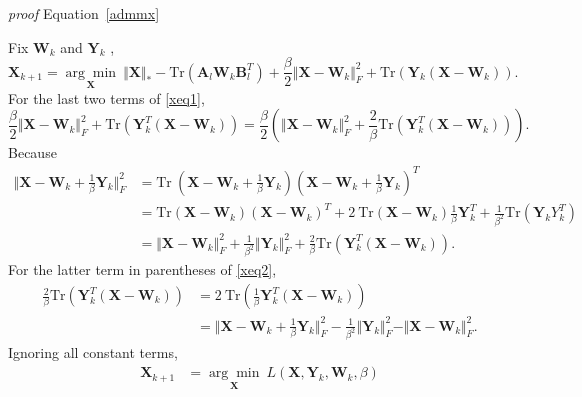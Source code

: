 \documentclass{article}
\begin{document}
{\textit{proof} Equation~\ref{admmx}

Fix $\mathbf W_k$ and $\mathbf Y_k$ ,
\begin{equation}
    \mathbf X_{k+1} =  \underset{\mathbf X}{\arg\min} \ \Vert\mathbf X \Vert_* - \text{Tr}(\mathbf A_l \mathbf W_k\mathbf B_l^T)    + \frac{\beta}{2}\Vert\mathbf X-\mathbf W_k \Vert_F^2 + \text{Tr}(\mathbf Y_k(\mathbf X-\mathbf W_k)).
    \label{xeq1}
\end{equation}
For the last two terms of \eqref{xeq1},
\begin{equation}
\frac{\beta}{2}\Vert\mathbf X-\mathbf W_k \Vert_F^2 + \text{Tr}(\mathbf Y_k^T(\mathbf X-\mathbf W_k))=  \frac{\beta}{2}\left( \Vert\mathbf X-\mathbf W_k \Vert_F^2 + \frac{2}{\beta} \text{Tr}(\mathbf Y_k^T(\mathbf X-\mathbf W_k)) \right).
\label{xeq2}
\end{equation}
Because
\begin{equation*}
    \begin{aligned}
        \Vert\mathbf X-\mathbf W_k+\frac{1}{\beta}\mathbf Y_k \Vert_F^2 & = \text{Tr} \ (\mathbf X-\mathbf W_k+\frac{1}{\beta}\mathbf Y_k)(\mathbf X-\mathbf W_k+\frac{1}{\beta}\mathbf Y_k)^T \\
        & = \text{Tr}(\mathbf X-\mathbf W_k)(\mathbf X-\mathbf W_k)^T + 2\ \text{Tr}(\mathbf X-\mathbf W_k)\frac{1}{\beta}\mathbf Y_k^T + \frac{1}{\beta^2}\text{Tr} (\mathbf Y_k Y_k^T) \\
        & = \Vert\mathbf X-\mathbf W_k \Vert_F^2 + \frac{1}{\beta^2}\Vert\mathbf Y_k \Vert_F^2 + \frac{2}{\beta}\text{Tr}(\mathbf Y_k^T(\mathbf X-\mathbf W_k)).
    \end{aligned}
\end{equation*}
For the latter term in parentheses of \eqref{xeq2},
\begin{equation}
    \begin{aligned}
\frac{2}{\beta} \text{Tr}(\mathbf Y_k^T(\mathbf X-\mathbf W_k)) & =  2 \ \text{Tr}(\frac{1}{\beta}\mathbf Y_k^T(\mathbf X-\mathbf W_k)) \\
    & = \Vert\mathbf X-\mathbf W_k+\frac{1}{\beta}\mathbf Y_k \Vert_F^2 - \frac{1}{\beta^2}\Vert\mathbf Y_k \Vert_F^2 - \Vert\mathbf X-\mathbf W_k \Vert_F^2.
\end{aligned}
\end{equation}
Ignoring all constant terms, 
\begin{equation}
\begin{aligned}
    \mathbf X_{k+1} & =\underset{\mathbf X}{\arg\min}\ L(\mathbf X,\mathbf Y_k, \mathbf W_k,\beta) \\

\end{aligned}
\end{equation}}
\end{document}

